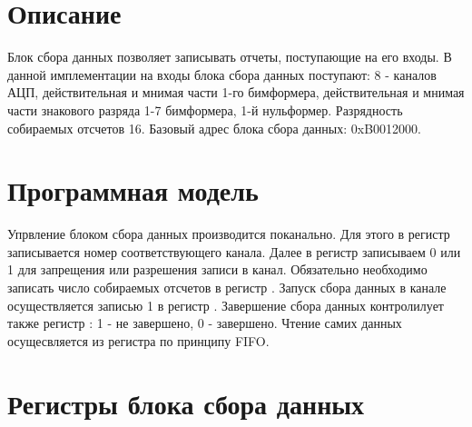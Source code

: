 \section{Описание}
\label{sec:descr}
Блок сбора данных позволяет записывать отчеты, поступающие на его входы. В
данной имплементации на входы блока сбора данных поступают: 8 - каналов АЦП,
действительная и мнимая части 1-го бимформера, действительная и мнимая части
знакового разряда 1-7 бимформера, 1-й нульформер. Разрядность собираемых
отсчетов 16.
\newline
Базовый адрес блока сбора данных: 0xB0012000.

\section{Программная модель}
\label{sec:pmodel}
Упрвление блоком сбора данных производится поканально. Для этого в регистр
 записывается номер соответствующего канала. Далее в регистр
 записываем 0 или 1 для запрещения или разрешения записи в
канал. Обязательно необходимо записать число собираемых отсчетов в регистр
. Запуск сбора данных в канале осуществляется записью 1 в
регистр . Завершение сбора данных контролилует также регистр
: 1 - не завершено, 0 - завершено. Чтение самих данных
осущесвляется из регистра  по принципу FIFO.

\section{Регистры блока сбора данных}
\label{sec:commons}

